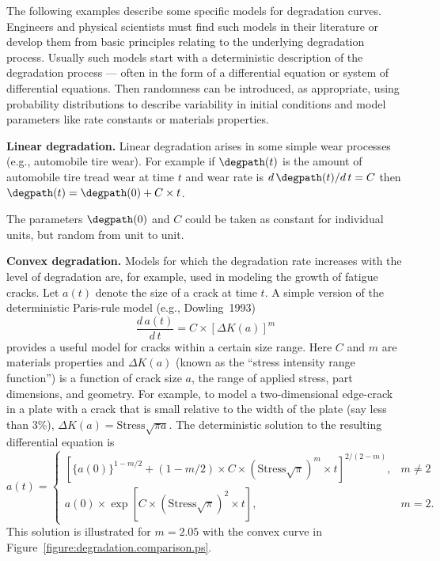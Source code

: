 The following examples describe some specific models for degradation curves.
Engineers and physical scientists must find such models in their literature
or develop them from basic principles relating to the underlying degradation
process. Usually such models start with a deterministic description of the
degradation process --- often in the form of a differential equation or
system of differential equations. Then randomness can be introduced, as
appropriate, using probability distributions to describe variability in
initial conditions and model parameters like rate constants or materials
properties.

\begin{example}{\bfseries Linear degradation.}
Linear degradation arises in some simple wear processes
(e.g., automobile tire wear). For example if $\degpath(t)$ 
is the amount of automobile tire tread wear
at time $t$ and
wear rate is $d\, \degpath(t)/d\, t = C$
then $\degpath(t)=\degpath(0)+C \times t$.
\end{example}
The parameters $\degpath(0)$ and $C$ could be taken as constant for
individual units, but random from unit to unit.

\begin{example}{\bfseries Convex degradation.}
Models for which the degradation rate increases with the level of
degradation are, for example, used in modeling the growth of fatigue
cracks. Let $a(t)$ denote the size of a crack at time $t$.  A simple
version of the deterministic Paris-rule model (e.g., Dowling~1993)
\begin{equation}
\label{equation:paris.diffyq}
\frac{d\,a(t)}{d\,t} = C  \times \left[ \Delta K(a) \right ]^{m}
\end{equation}
provides a useful model for cracks within a certain size range.  Here
$C$ and $m$ are materials properties and $\Delta K(a)$ (known as the
``stress intensity range function'') is a function of crack size $a$,
the range of applied stress, part dimensions, and geometry. For
example, to model a two-dimensional edge-crack in a plate with a crack
that is small relative to the width of the plate (say less than 3\%),
$\Delta K(a)=\text{Stress} \sqrt{\pi a}$. The deterministic solution to the
resulting differential equation is
\begin{equation}
\label{equation:paris.diffyq.solution}
a(t) = \left\{ \begin{array}{lll}
\left[\{a(0)\}^{1-m/2} + 
(1-m/2)  \times C  \times (\text{Stress}\sqrt{\pi})^{m}  \times 
t\right]^{\displaystyle 2/(2-m)}, & m \ne 2\\[3ex]
a(0)  \times  \exp \left [ C  \times (\text{Stress}\sqrt{\pi})^{2} \times
 t \right ], & m = 2 .
\end{array} \right.
\end{equation}
This solution is illustrated for $m=2.05$ with the convex curve in
Figure~\ref{figure:degradation.comparison.ps}.
\end{example}

